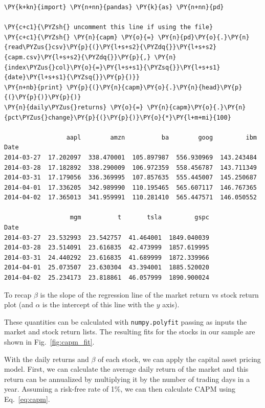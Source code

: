 \begin{codebox}
\begin{Verbatim}[commandchars=\\\{\}]
\PY{k+kn}{import} \PY{n+nn}{pandas} \PY{k}{as} \PY{n+nn}{pd}

\PY{c+c1}{\PYZsh{} uncomment this line if using the file}		
\PY{c+c1}{\PYZsh{} \PY{n}{capm} \PY{o}{=} \PY{n}{pd}\PY{o}{.}\PY{n}{read\PYZus{}csv}\PY{p}{(}\PY{l+s+s2}{\PYZdq{}}\PY{l+s+s2}{capm.csv}\PY{l+s+s2}{\PYZdq{}}\PY{p}{,} \PY{n}{index\PYZus{}col}\PY{o}{=}\PY{l+s+s1}{\PYZsq{}}\PY{l+s+s1}{date}\PY{l+s+s1}{\PYZsq{}}\PY{p}{)}}
\PY{n+nb}{print} \PY{p}{(}\PY{n}{capm}\PY{o}{.}\PY{n}{head}\PY{p}{(}\PY{p}{)}\PY{p}{)}
\PY{n}{daily\PYZus{}returns} \PY{o}{=} \PY{n}{capm}\PY{o}{.}\PY{n}{pct\PYZus{}change}\PY{p}{(}\PY{p}{)}\PY{o}{*}\PY{l+m+mi}{100}

                 aapl        amzn          ba        goog         ibm
Date                                                                    
2014-03-27  17.202097  338.470001  105.897987  556.930969  143.243484   
2014-03-28  17.182892  338.290009  106.972359  558.456787  143.711349   
2014-03-31  17.179056  336.369995  107.857635  555.445007  145.250687   
2014-04-01  17.336205  342.989990  110.195465  565.607117  146.767365   
2014-04-02  17.365013  341.959991  110.281410  565.447571  146.050552   

                  mgm          t       tsla         gspc  
Date                                                      
2014-03-27  23.532993  23.542757  41.464001  1849.040039  
2014-03-28  23.514091  23.616835  42.473999  1857.619995  
2014-03-31  24.440292  23.616835  41.689999  1872.339966  
2014-04-01  25.073507  23.630304  43.394001  1885.520020  
2014-04-02  25.234173  23.818861  46.057999  1890.900024  
\end{Verbatim}
\end{codebox}

To recap $\beta$ is the slope of the regression line of the market return vs stock return plot (and $\alpha$ is the intercept of this line with the $y$ axis).

These quantities can be calculated with \texttt{numpy.polyfit} passing as inputs the market and stock return lists. 
The resulting fits for the stocks in our sample are shown in Fig.~\ref{fig:capm_fit}.

With the daily returns and $\beta$ of each stock, we can apply the capital asset pricing model. First, we can calculate the average daily return of the market and this return can be annualized by multiplying it by the number of trading days in a year.
Assuming a risk-free rate of 1\%, we can then calculate CAPM using Eq.~\ref{eq:capm}.

